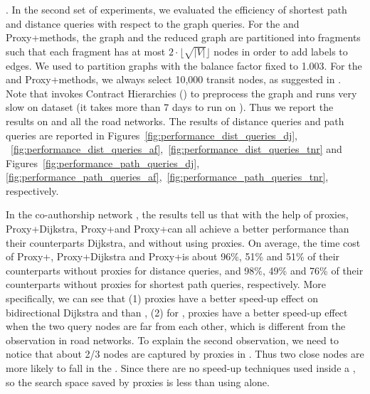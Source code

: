 .
%
In the second set of experiments, we evaluated the efficiency of shortest path and distance queries with respect to the graph queries. For the \arcflag and Proxy+\arcflag methods, the graph and the reduced graph are partitioned into fragments such that each fragment has at most $2\cdot \lfloor\sqrt{|V|}\rfloor$ nodes in order to add labels to edges. We used \metis  to partition graphs with the balance factor fixed to 1.003. For the \tnr and Proxy+\tnr methods, we always select 10,000 transit nodes, as suggested in \cite{arz2013transit}. Note that \tnr invokes Contract Hierarchies (\ch) to preprocess the graph and \ch runs very slow on \dblp dataset (it takes more than 7 days to run \ch on \dblp). Thus we report the results on \dblpone and all the road networks. The results of distance queries and path queries are reported in Figures~\ref{fig:performance_dist_queries_dj}, ~\ref{fig:performance_dist_queries_af},~\ref{fig:performance_dist_queries_tnr} and Figures~\ref{fig:performance_path_queries_dj},\ref{fig:performance_path_queries_af},~\ref{fig:performance_path_queries_tnr}, respectively.

In the co-authorship network \dblpone, the results tell us that with the help of proxies, Proxy+Dijkstra, Proxy+\arcflag and Proxy+\tnr can all achieve a better performance than their counterparts Dijkstra, \arcflag and \tnr without using proxies. On average, the time cost of Proxy+\arcflag, Proxy+Dijkstra and Proxy+\tnr is about 96\%, 51\% and 51\% of their counterparts without proxies for distance queries, and 98\%, 49\% and 76\% of their counterparts without proxies for shortest path queries, respectively. More specifically, we can see that (1) proxies have a better speed-up effect on bidirectional Dijkstra and \tnr than \arcflag, (2) for \arcflag, proxies have a better speed-up effect when the two query nodes are far from each other, which is different from the observation in road networks. To explain the second observation, we need to notice that about 2/3 nodes are captured by proxies in \dblpone. Thus two close nodes are more likely to fall in the \dras. Since there are no speed-up techniques used inside a \dra, so the search space saved by proxies is less than using \arcflag alone.


